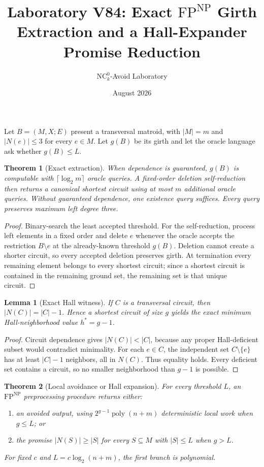 \documentclass[11pt]{article}
\newtheorem{theorem}{Theorem}
\newtheorem{lemma}{Lemma}
\begin{document}
\title{Laboratory V84: Exact $\mathrm{FP}^{\mathrm{NP}}$ Girth Extraction and a Hall-Expander Promise Reduction}
\author{NC$^0_k$-Avoid Laboratory}
\date{August 2026}
\maketitle

Let $B=(M,X;E)$ present a transversal matroid, with $|M|=m$ and
$|N(e)|\leq 3$ for every $e\in M$. Let $g(B)$ be its girth and let the oracle
language ask whether $g(B)\leq L$.

\begin{theorem}[Exact extraction]
When dependence is guaranteed, $g(B)$ is computable with
$\lceil\log_2 m\rceil$ oracle queries. A fixed-order deletion self-reduction
then returns a canonical shortest circuit using at most $m$ additional oracle
queries. Without guaranteed dependence, one existence query suffices.
Every query preserves maximum left degree three.
\end{theorem}

\begin{proof}
Binary-search the least accepted threshold. For the self-reduction, process
left elements in a fixed order and delete $e$ whenever the oracle accepts the
restriction $B\setminus e$ at the already-known threshold $g(B)$. Deletion
cannot create a shorter circuit, so every accepted deletion preserves girth.
At termination every remaining element belongs to every shortest circuit;
since a shortest circuit is contained in the remaining ground set, the
remaining set is that unique circuit.
\end{proof}

\begin{lemma}[Exact Hall witness]
If $C$ is a transversal circuit, then $|N(C)|=|C|-1$. Hence a shortest circuit
of size $g$ yields the exact minimum Hall-neighborhood value $h^*=g-1$.
\end{lemma}

\begin{proof}
Circuit dependence gives $|N(C)|<|C|$, because any proper Hall-deficient subset
would contradict minimality. For each $e\in C$, the independent set
$C\setminus\{e\}$ has at least $|C|-1$ neighbors, all in $N(C)$. Thus equality
holds. Every deficient set contains a circuit, so no smaller neighborhood
than $g-1$ is possible.
\end{proof}

\begin{theorem}[Local avoidance or Hall expansion]
For every threshold $L$, an $\mathrm{FP}^{\mathrm{NP}}$ preprocessing procedure
returns either:
\begin{enumerate}
\item an avoided output, using $2^{g-1}\operatorname{poly}(n+m)$ deterministic
local work when $g\leq L$; or
\item the promise $|N(S)|\geq |S|$ for every $S\subseteq M$ with $|S|\leq L$
when $g>L$.
\end{enumerate}
For fixed $c$ and $L=c\log_2(n+m)$, the first branch is polynomial.
\end{theorem}
\end{document}
